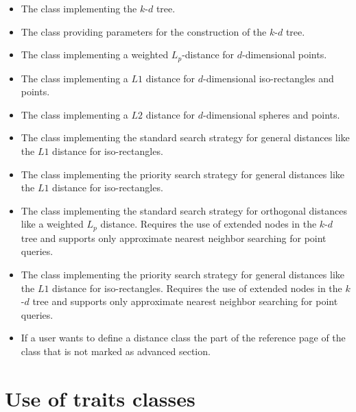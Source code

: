 \begin{itemize}

\item
The class  implementing the $k$-$d$ tree.

\item
The class  providing parameters for the construction of the $k$-$d$ tree.

\item
The class  implementing a weighted $L_p$-distance for $d$-dimensional points.

\item
The class  implementing a $L1$ distance for $d$-dimensional
iso-rectangles and points. 

\item
The class  implementing a $L2$ distance for $d$-dimensional
spheres and points. 

\item
The class  implementing the standard search strategy for general distances
like the $L1$ distance for iso-rectangles.

\item
The class  implementing the priority search strategy for general distances
like the $L1$ distance for iso-rectangles.

\item
The class  implementing the standard search strategy for orthogonal distances
like a weighted $L_p$ distance. Requires the use of extended nodes in the $k$-$d$ tree and supports
only approximate nearest neighbor searching for point queries.

\item
The class  implementing the priority search strategy for general distances
like the $L1$ distance for iso-rectangles. Requires the use of extended nodes in the $k$-$d$ tree
and supports
only approximate nearest neighbor searching for point queries.

\item
If a user wants to define a distance class the part of the reference page of the class
 that is not marked as advanced section.
 
\end{itemize}

\section{Use of traits classes}

